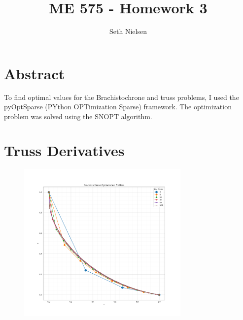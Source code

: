\documentclass{article}
\begin{document}
\title{ME 575 - Homework 3}
\author{Seth Nielsen}
\date{}
\maketitle

\section*{Abstract}

To find optimal values for the Brachistochrone and truss problems, I used the pyOptSparse (PYthon OPTimization Sparse) framework. The optimization problem was solved using the SNOPT algorithm.
\section{Truss Derivatives}

\begin{figure}[htbp]
	\centering
	\includegraphics[width=0.75\textwidth]{figures/curve.png}
	\caption{\label{fig:}}
	\end{figure}
\end{document}
